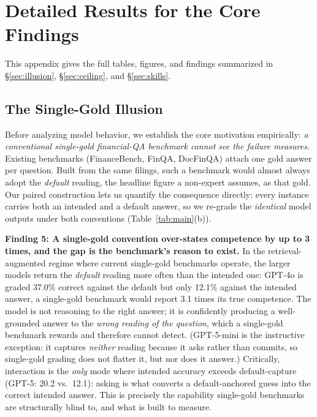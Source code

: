 \section{Detailed Results for the Core Findings}
\label{app:maindetails}

This appendix gives the full tables, figures, and findings summarized in \S\ref{sec:illusion},
\S\ref{sec:ceiling}, and \S\ref{sec:skills}.

\subsection{The Single-Gold Illusion}
Before analyzing model behavior, we establish the core motivation empirically:
\emph{a conventional single-gold financial-QA benchmark cannot see the failure
\fininteract measures.} Existing benchmarks (FinanceBench, FinQA, DocFinQA)
attach one gold answer per question. Built from the same filings, such a
benchmark would almost always adopt the \emph{default} reading, the headline
figure a non-expert assumes, as that gold. Our paired construction lets us
quantify the consequence directly: every instance carries both an intended and a
default answer, so we re-grade the \emph{identical} model outputs under both
conventions (Table~\ref{tab:main}(b)).



\textbf{Finding 5: A single-gold convention over-states competence by up to
3 times, and the gap is the benchmark's reason to exist.} In the
retrieval-augmented regime where current single-gold benchmarks operate, the
larger models return the \emph{default} reading more often than the intended one:
GPT-4o is graded 37.0\% correct against the default but only 12.1\% against
the intended answer, a single-gold benchmark would report 3.1 times its true
competence. The model is not reasoning to the right answer; it is confidently
producing a well-grounded answer to the \emph{wrong reading of the question},
which a single-gold benchmark rewards and therefore cannot detect. (GPT-5-mini is
the instructive exception: it captures \emph{neither} reading because it asks
rather than commits, so single-gold grading does not flatter it, but
nor does it answer.) Critically,
interaction is the \emph{only} mode where intended accuracy exceeds
default-capture (GPT-5: 20.2 vs.\ 12.1): asking is what converts a
default-anchored guess into the correct intended answer. This is precisely the
capability single-gold benchmarks are structurally blind to, and what
\fininteract is built to measure.

